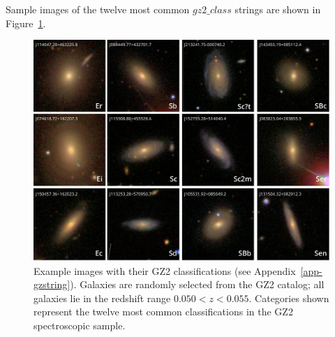 \documentclass[useAMS,usenatbib]{mn2e}
\begin{document}
Sample images of the twelve most common $gz2\_class$ strings are shown in Figure~\ref{fig-exampleimages}. 

\begin{figure}
\includegraphics[angle=0,width=7.0in]{figures/gz2_examples.pdf}
\caption{Example images with their GZ2 classifications (see Appendix~\ref{app-gzstring}). Galaxies are randomly selected from the GZ2 catalog; all galaxies lie in the redshift range $0.050 < z < 0.055$. Categories shown represent the twelve most common classifications in the GZ2 spectroscopic sample. 
\label{fig-exampleimages}}
\end{figure}

\label{lastpage}
\end{document}

